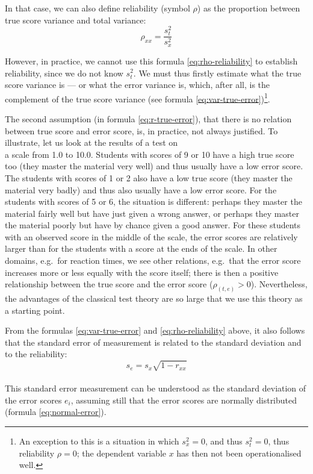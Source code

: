 \documentclass[
]{book}
\begin{document}
In that case, we can also define reliability (symbol \(\rho\)) as the
proportion between true score variance and total variance:\\
\begin{equation}
  \label{eq:rho-reliability}
  \rho_{xx} = \frac{s^2_t}{s^2_x}
\end{equation}

However, in practice, we cannot use this formula \eqref{eq:rho-reliability} to
establish reliability, since we do not know \(s^2_t\). We must thus firstly
estimate what the true score variance is --- or what the error variance is, which, after all,
is the complement of the true score variance (see
formula \eqref{eq:var-true-error})\footnote{An exception to this is a situation in which \(s^2_x=0\), and thus \(s^2_t=0\), thus reliability \(\rho=0\); the dependent variable \(x\) has then not been
  operationalised well.}.

The second assumption (in formula \eqref{eq:r-true-error}), that there is no relation between
true score and error score, is, in practice, not always justified.
To illustrate, let us look at the results of a test on\\
a scale from 1.0 to 10.0. Students with scores of 9 or 10 have a high
true score too (they master the material very well) and thus usually have a low
error score. The students with scores of 1 or 2 also have a low true score
(they master the material very badly) and thus also usually have a low
error score. For the students with scores of 5 or 6,
the situation is different: perhaps they master the material fairly well
but have just given a wrong answer, or perhaps they master the material poorly but have by chance given a good answer. For these students with an observed
score in the middle of the scale, the error scores are relatively larger
than for the students with a score at the ends of the scale. In other domains,
e.g.~for reaction times, we see other relations, e.g.~that the error score increases
more or less equally with the score itself; there is then a positive relationship
between the true score and the error score (\(\rho_{(t,e)}>0\)). Nevertheless,
the advantages of the classical test theory are so large that we use this
theory as a starting point.

From the formulas \eqref{eq:var-true-error} and \eqref{eq:rho-reliability}
above, it also follows that the standard error of measurement is related to the
standard deviation and to the reliability:
\begin{equation}
   \label{eq:standard-error-measurement}
    s_e = s_x \sqrt{1-r_{xx}}
\end{equation}\\
This standard error measurement can be understood
as the standard deviation of the error scores \(e_i\), assuming still that
the error scores are normally distributed (formula \eqref{eq:normal-error}).
\end{document}
